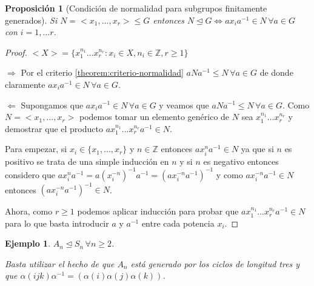 \documentclass{article}
\theoremstyle{theorem-style}  %
\newtheorem{proposition}[theorem]{Proposición}
\theoremstyle{definition-style}
\theoremstyle{example-style}
\newtheorem{example}{Ejemplo}[section]
\begin{document}
\begin{proposition}[Condición de normalidad para subgrupos finitamente generados]
Si $N = <x_1,...,x_r>  \le G$ entonces $N \unlhd G \iff ax_ia^{-1} \in N \, \forall a \in G$ con $i = 1,...r$.
\end{proposition}
\begin{proof}
$<X> = \{x_1^{n_1}...x_r^{n_r}:x_i \in X,n_i \in \mathbb{Z},r \ge 1\}$

$\Rightarrow$ Por el criterio \ref{theorem:criterio-normalidad} $aNa^{-1} \le N \, \forall a \in G$ de donde claramente $ax_ia^{-1} \in N \, \forall a \in G$.

$\Leftarrow$ Supongamos que $ax_ia^{-1} \in N \, \forall a \in G$ y veamos que $aNa^{-1} \le N \, \forall a \in G$. Como $N = <x_1,...,x_r>$ podemos tomar un elemento genérico de $N$ sea $x_1^{n_1}...x_r^{n_r}$ y demostrar que el producto $ax_1^{n_1}...x_r^{n_r}a^{-1} \in N$.

Para empezar, si $x_i \in \{x_1,...,x_r\}$ y $n \in \mathbb{Z}$ entonces $ax_i^na^{-1} \in N$ ya que si $n$ es positivo se trata de una simple inducción en $n$ y si $n$ es negativo entonces considero que $ax_i^na^{-1} = a(x_i^{-n})^{-1}a^{-1} = (ax_i^{-n}a^{-1})^{-1}$ y como $ax_i^{-n}a^{-1} \in N$ entonces $(ax_i^{-n}a^{-1})^{-1} \in N$.

Ahora, como $r \ge 1$ podemos aplicar inducción para probar que $ax_1^{n_1}...x_r^{n_r}a^{-1} \in N$ para lo que basta introducir $a$ y $a^{-1}$ entre cada potencia $x_i$.
\end{proof}

\begin{example}
$A_n \trianglelefteq S_n \, \forall n \geq 2$.

Basta utilizar el hecho de que $A_n$ está generado por los ciclos de longitud tres y que $\alpha (ijk) \alpha^{-1} = (\alpha(i)\alpha(j)\alpha(k))$.
\end{example}
\end{document}
